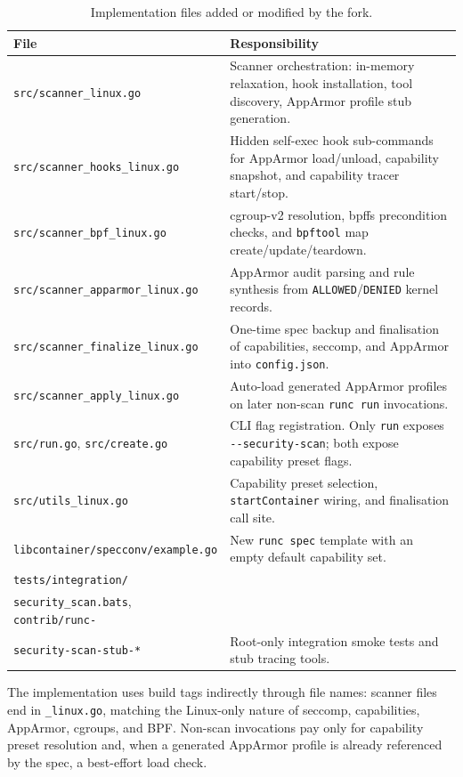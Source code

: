 \begin{table}[ht]
\centering
\caption{Implementation files added or modified by the fork.}
\label{tab:impl-files}
\footnotesize
\begin{tabularx}{\textwidth}{>{\raggedright\arraybackslash}p{5.9cm} X}
\toprule
\textbf{File} & \textbf{Responsibility} \\
\midrule
\texttt{src/scanner\_linux.go} & Scanner orchestration: in-memory relaxation, hook installation, tool discovery, AppArmor profile stub generation. \\
\texttt{src/scanner\_hooks\_linux.go} & Hidden self-exec hook sub-commands for AppArmor load/unload, capability snapshot, and capability tracer start/stop. \\
\texttt{src/scanner\_bpf\_linux.go} & cgroup-v2 resolution, bpffs precondition checks, and \texttt{bpftool} map create/update/teardown. \\
\texttt{src/scanner\_apparmor\_linux.go} & AppArmor audit parsing and rule synthesis from \texttt{ALLOWED}/\texttt{DENIED} kernel records. \\
\texttt{src/scanner\_finalize\_linux.go} & One-time spec backup and finalisation of capabilities, seccomp, and AppArmor into \texttt{config.json}. \\
\texttt{src/scanner\_apply\_linux.go} & Auto-load generated AppArmor profiles on later non-scan \texttt{runc run} invocations. \\
\texttt{src/run.go}, \texttt{src/create.go} & CLI flag registration. Only \texttt{run} exposes \texttt{-{}-security-scan}; both expose capability preset flags. \\
\texttt{src/utils\_linux.go} & Capability preset selection, \texttt{startContainer} wiring, and finalisation call site. \\
\texttt{libcontainer/specconv/example.go} & New \texttt{runc spec} template with an empty default capability set. \\
\texttt{tests/integration/}\\\texttt{security\_scan.bats}, \texttt{contrib/runc-}\\\texttt{security-scan-stub-*} & Root-only integration smoke tests and stub tracing tools. \\
\bottomrule
\end{tabularx}
\end{table}

The implementation uses build tags indirectly through file names: scanner files end in \texttt{\_linux.go}, matching the Linux-only nature of seccomp, capabilities, AppArmor, cgroups, and BPF. Non-scan invocations pay only for capability preset resolution and, when a generated AppArmor profile is already referenced by the spec, a best-effort load check.

